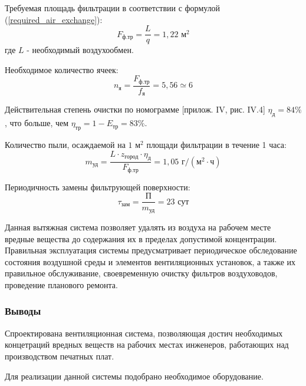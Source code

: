 Требуемая площадь фильтрации в соответствии с формулой (\ref{required_air_exchange}):
$$
    F_\text{ф.тр} = \frac{L}{q} = 1,22 \text{ м}^2
$$
где $L$ - необходимый воздухообмен.

Необходимое количество ячеек:
$$
    n_\text{я} =    \frac{F_\text{ф.тр}}{f_\text{я}} = 5,56
                    \simeq 6
$$

Действительная степень очистки по номограмме
\cite{air_ventilation_and_conditioning}[прилож. IV, рис. IV.4] $\eta_\text{д} = 84 \%$, что
больше, чем $\eta_\text{тр} = 1 - E_\text{тр} = 83 \%$.

Количество пыли, осаждаемой на $1 \text{ м}^2$ площади фильтрации в течение 1 часа:
$$
    m_\text{уд} = \frac{L \cdot z_\text{город} \cdot \eta_\text{д}}{F_\text{ф.тр}}
            = 1,05 \text{ г/}(\text{м}^2 \cdot \text{ч})
$$

Периодичность замены фильтрующей поверхности:
$$
    \tau_\text{зам} = \frac{\text{П}}{m_\text{уд}} = 23 \text{ сут}
$$

Данная вытяжная система позволяет удалять из воздуха на рабочем месте вредные
вещества до содержания их в пределах допустимой концентрации. Правильная эксплуатация
системы предусматривает периодическое обследование состояния воздушной среды и
элементов вентиляционных установок, а также их правильное обслуживание, своевременную
очистку фильтров воздуховодов, проведение планового ремонта.

\subsubsection{Выводы}

Спроектирована вентиляционная система, позволяющая достич необходимых концетраций
вредных веществ на рабочих местах инженеров, работающих над производством печатных плат.

Для реализации данной системы подобрано необходимое оборудование.
